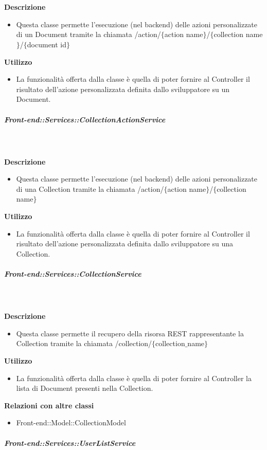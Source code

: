         \textbf{\\ \\ Descrizione} 
          \begin{itemize}
            \item[] Questa classe permette l'esecuzione (nel backend) delle azioni personalizzate di un Document tramite la chiamata /action/$\{$action name$\}$/$\{$collection name$\}$/$\{$document id$\}$
          \end{itemize}      
        \textbf{Utilizzo}  
          \begin{itemize}
            \item[] La funzionalità offerta dalla classe è quella di poter fornire al Controller il risultato dell'azione personalizzata definita dallo sviluppatore su un Document.
          \end{itemize}
      \subparagraph{Front-end::Services::CollectionActionService}
        
        \textbf{\\ \\ Descrizione} 
          \begin{itemize}
            \item[] Questa classe permette l'esecuzione (nel backend) delle azioni personalizzate di una Collection tramite la chiamata /action/$\{$action name$\}$/$\{$collection name$\}$
          \end{itemize}      
        \textbf{Utilizzo}  
          \begin{itemize}
            \item[] La funzionalità offerta dalla classe è quella di poter fornire al Controller il risultato dell'azione personalizzata definita dallo sviluppatore su una Collection.
          \end{itemize}
      \subparagraph{Front-end::Services::CollectionService}
        
        \textbf{\\ \\ Descrizione} 
          \begin{itemize}
            \item[] Questa classe permette il recupero della risorsa REST rappresentante la Collection tramite la chiamata  /collection/$\{$collection$\_$name$\}$
          \end{itemize}      
        \textbf{Utilizzo}  
          \begin{itemize}
            \item[] La  funzionalità offerta dalla classe è quella di poter fornire al Controller la lista di Document presenti nella Collection.
          \end{itemize}
          \textbf{Relazioni con altre classi}
          \begin{itemize}
              \item{Front-end::Model::CollectionModel}
          \end{itemize}
      \subparagraph{Front-end::Services::UserListService}
        
